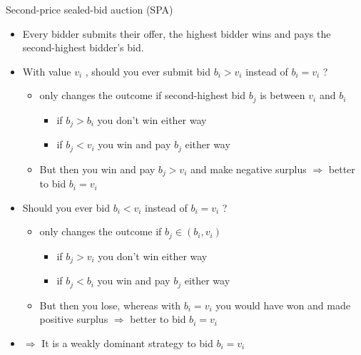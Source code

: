 \documentclass[bigger]{beamer}
\newcommand{\Ra}{\Rightarrow} \newcommand{\ra}{\rightarrow} \newcommand{\Lra}{\Leftrightarrow}
\begin{document}
\begin{frame}[label={sec:org88be864}]{Second-price sealed-bid auction (SPA)}
\begin{itemize}
\item Every bidder submits their offer, the highest bidder wins and pays the second-highest bidder’s bid.
\item With value \(v_i\) , should you ever submit bid \(b_i > v_i\) instead of \(b_i = v_i\) ?
\begin{itemize}
\item only changes the outcome if second-highest bid \(b_j\) is between \(v_i\) and \(b_i\)
\begin{itemize}
\item if \(b_j > b_i\) you don’t win either way
\item if \(b_j < v_i\) you win and pay \(b_j\) either way
\end{itemize}
\item But then you win and pay \(b_j > v_i\) and make negative surplus \(\Ra\)  better to bid \(b_i = v_i\)
\pause
\end{itemize}
\item Should you ever bid \(b_i < v_i\) instead of \(b_i = v_i\) ?
\begin{itemize}
\item only changes the outcome if \(b_j \in (b_i , v_i )\)
\begin{itemize}
\item if \(b_j > v_i\) you don’t win either way
\item if \(b_j < b_i\) you win and pay \(b_j\) either way
\end{itemize}
\item But then you lose, whereas with \(b_i = v_i\) you would have won and made positive surplus \(\Ra\) better to bid \(b_i = v_i\)
\end{itemize}
\item \(\Ra\) It is a weakly dominant strategy to bid \(b_i = v_i\)
\end{itemize}
\end{frame}
\end{document}
